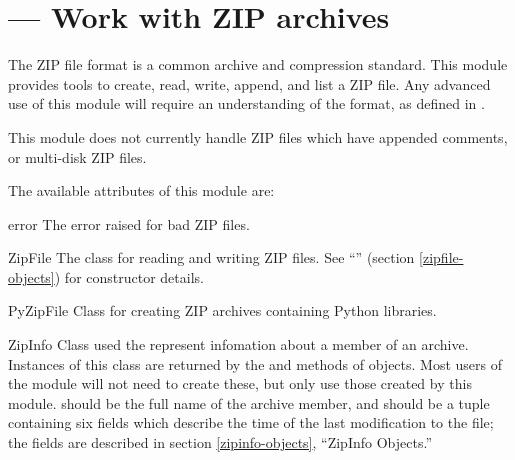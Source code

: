 \section{ ---
         Work with ZIP archives}



The ZIP file format is a common archive and compression standard.
This module provides tools to create, read, write, append, and list a
ZIP file.  Any advanced use of this module will require an
understanding of the format, as defined in
.

This module does not currently handle ZIP files which have appended
comments, or multi-disk ZIP files.

The available attributes of this module are:

\begin{excdesc}{error}
  The error raised for bad ZIP files.
\end{excdesc}

\begin{classdesc*}{ZipFile}
  The class for reading and writing ZIP files.  See
  ``'' (section \ref{zipfile-objects}) for
  constructor details.
\end{classdesc*}

\begin{classdesc*}{PyZipFile}
  Class for creating ZIP archives containing Python libraries.
\end{classdesc*}

\begin{classdesc}{ZipInfo}{}
  Class used the represent infomation about a member of an archive.
  Instances of this class are returned by the  and
   methods of  objects.  Most users
  of the  module will not need to create these, but
  only use those created by this module.
   should be the full name of the archive member, and
   should be a tuple containing six fields which
  describe the time of the last modification to the file; the fields
  are described in section \ref{zipinfo-objects}, ``ZipInfo Objects.''
\end{classdesc}

